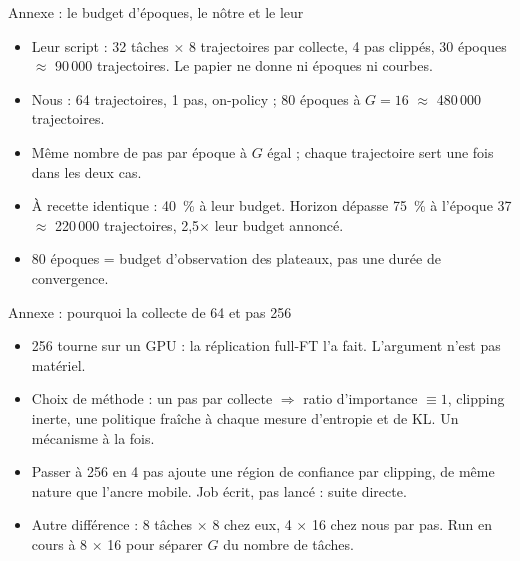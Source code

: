 \documentclass[aspectratio=169,11pt]{beamer}
\begin{document}
\begin{frame}{Annexe : le budget d'époques, le nôtre et le leur}
\begin{itemize}
    \item Leur script : 32 tâches $\times$ 8 trajectoires par collecte, 4 pas clippés, 30 époques $\approx$ 90\,000 trajectoires. Le papier ne donne ni époques ni courbes.
    \item Nous : 64 trajectoires, 1 pas, on-policy ; 80 époques à $G=16$ $\approx$ 480\,000 trajectoires.
    \item Même nombre de pas par époque à $G$ égal ; chaque trajectoire sert une fois dans les deux cas.
    \item À recette identique : 40~\% à leur budget. Horizon dépasse 75~\% à l'époque 37 $\approx$ 220\,000 trajectoires, 2,5$\times$ leur budget annoncé.
    \item 80 époques = budget d'observation des plateaux, pas une durée de convergence.
\end{itemize}
\end{frame}

\begin{frame}{Annexe : pourquoi la collecte de 64 et pas 256}
\begin{itemize}
    \item 256 tourne sur un GPU : la réplication full-FT l'a fait. L'argument n'est pas matériel.
    \item Choix de méthode : un pas par collecte $\Rightarrow$ ratio d'importance $\equiv 1$, clipping inerte, une politique fraîche à chaque mesure d'entropie et de KL. Un mécanisme à la fois.
    \item Passer à 256 en 4 pas ajoute une région de confiance par clipping, de même nature que l'ancre mobile. Job écrit, pas lancé : suite directe.
    \item Autre différence : 8 tâches $\times$ 8 chez eux, 4 $\times$ 16 chez nous par pas. Run en cours à 8 $\times$ 16 pour séparer $G$ du nombre de tâches.
\end{itemize}
\end{frame}
\end{document}
